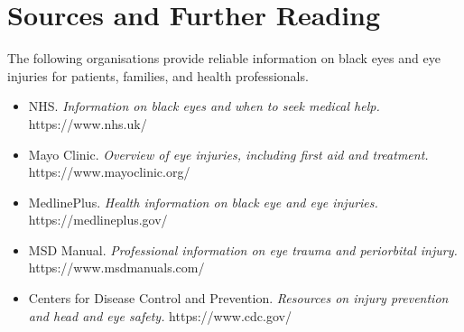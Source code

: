 \section*{Sources and Further Reading}
The following organisations provide reliable information on black eyes and eye injuries for patients, families, and health professionals.

\begin{itemize}
    \item NHS. \textit{Information on black eyes and when to seek medical help.} https://www.nhs.uk/
    \item Mayo Clinic. \textit{Overview of eye injuries, including first aid and treatment.} https://www.mayoclinic.org/
    \item MedlinePlus. \textit{Health information on black eye and eye injuries.} https://medlineplus.gov/
    \item MSD Manual. \textit{Professional information on eye trauma and periorbital injury.} https://www.msdmanuals.com/
    \item Centers for Disease Control and Prevention. \textit{Resources on injury prevention and head and eye safety.} https://www.cdc.gov/
\end{itemize}
